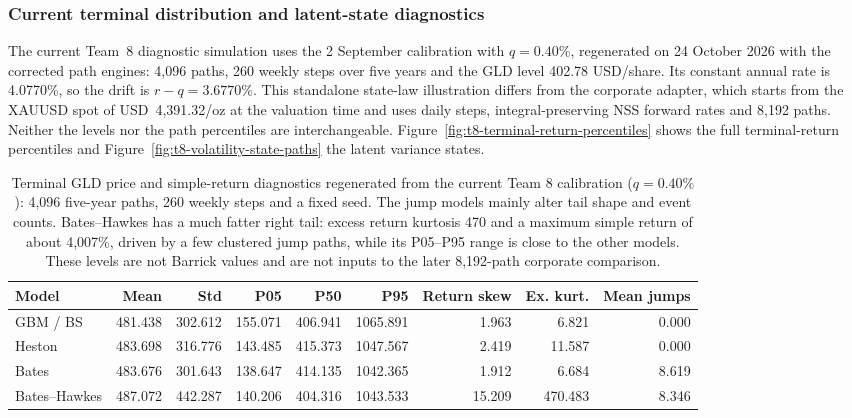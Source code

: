 \subsubsection{Current terminal distribution and latent-state diagnostics}

The current Team~8 diagnostic simulation uses the 2 September calibration
with $q=0.40\%$, regenerated on 24 October 2026 with the corrected path
engines: 4,096 paths, 260 weekly steps over five years and the GLD level
402.78 USD/share. Its constant annual rate is 4.0770\%, so the drift is
$r-q=3.6770\%$. This standalone state-law illustration differs from the
corporate adapter, which starts from the XAUUSD spot of USD~4,391.32/oz at the
valuation time and uses daily steps, integral-preserving NSS forward rates and
8,192 paths. Neither the levels nor the path percentiles are interchangeable.
Figure~\ref{fig:t8-terminal-return-percentiles} shows the full terminal-return
percentiles and Figure~\ref{fig:t8-volatility-state-paths} the latent
variance states.

\begin{table}[H]
\centering
\scriptsize
\setlength{\tabcolsep}{2.45pt}
\begin{tabular}{@{}lrrrrrrrr@{}}
\toprule
Model & Mean & Std & P05 & P50 & P95 & Return skew & Ex. kurt. & Mean jumps \\
\midrule
GBM / BS & 481.438 & 302.612 & 155.071 & 406.941 & 1065.891 & 1.963 & 6.821 & 0.000 \\
Heston & 483.698 & 316.776 & 143.485 & 415.373 & 1047.567 & 2.419 & 11.587 & 0.000 \\
Bates & 483.676 & 301.643 & 138.647 & 414.135 & 1042.365 & 1.912 & 6.684 & 8.619 \\
Bates--Hawkes & 487.072 & 442.287 & 140.206 & 404.316 & 1043.533 & 15.209 & 470.483 & 8.346 \\
\bottomrule
\end{tabular}
\caption{Terminal GLD price and simple-return diagnostics regenerated from the
current Team 8 calibration ($q=0.40\%$): 4,096 five-year paths, 260 weekly
steps and a fixed seed. The
jump models mainly alter tail shape and event counts. Bates--Hawkes has
a much fatter right tail: excess return kurtosis 470 and a maximum simple
return of about 4,007\%, driven by a few clustered jump paths, while its
P05--P95 range is close to the other models. These levels are not Barrick
values and are not inputs to the later 8,192-path corporate comparison.}
\label{tab:t8-terminal-path-stats}
\end{table}

